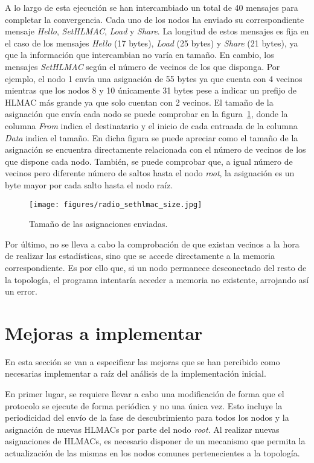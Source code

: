 A lo largo de esta ejecución se han intercambiado un total de 40 mensajes para completar la convergencia.
Cada uno de los nodos ha enviado su correspondiente mensaje \textit{Hello}, \textit{SetHLMAC}, \textit{Load} y \textit{Share}.
La longitud de estos mensajes es fija en el caso de los mensajes \textit{Hello} (17 bytes), \textit{Load} (25 bytes) y \textit{Share} (21 bytes), ya que la información que intercambian no varía en tamaño.
En cambio, los mensajes \textit{SetHLMAC} según el número de vecinos de los que disponga.
Por ejemplo, el nodo 1 envía una asignación de 55 bytes ya que cuenta con 4 vecinos mientras que los nodos 8 y 10 únicamente 31 bytes pese a indicar un prefijo de \ac{HLMAC} más grande ya que solo cuentan con 2 vecinos.
El tamaño de la asignación que envía cada nodo se puede comprobar en la figura~\ref{fig:radio_sethlmac_size}, donde la columna \textit{From} indica el destinatario y el inicio de cada entraada de la columna \textit{Data} indica el tamaño.
En dicha figura se puede apreciar como el tamaño de la asignación se encuentra directamente relacionada con el número de vecinos de los que dispone cada nodo.
También, se puede comprobar que, a igual número de vecinos pero diferente número de saltos hasta el nodo \textit{root}, la asignación es un byte mayor por cada salto hasta el nodo raíz.

\begin{figure}[h]
    \centering
    \texttt{[image: figures/radio\_sethlmac\_size.jpg]}
    \caption{Tamaño de las asignaciones enviadas.}
    \label{fig:radio_sethlmac_size}
\end{figure}

Por último, no se lleva a cabo la comprobación de que existan vecinos a la hora de realizar las estadísticas, sino que se accede directamente a la memoria correspondiente.
Es por ello que, si un nodo permanece desconectado del resto de la topología, el programa intentaría acceder a memoria no existente, arrojando así un error.

\section{Mejoras a implementar}\label{sec:mejoras}

En esta sección se van a especificar las mejoras que se han percibido como necesarias implementar a raíz del análisis de la implementación inicial.

En primer lugar, se requiere llevar a cabo una modificación de forma que el protocolo se ejecute de forma periódica y no una única vez.
Esto incluye la periodicidad del envío de la fase de descubrimiento para todos los nodos y la asignación de nuevas \acp{HLMAC} por parte del nodo \textit{root}.
Al realizar nuevas asignaciones de \acp{HLMAC}, es necesario disponer de un mecanismo que permita la actualización de las mismas en los nodos comunes pertenecientes a la topología.

